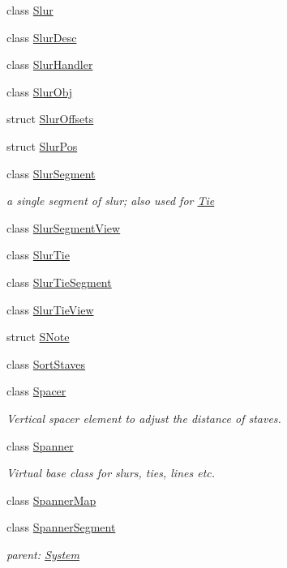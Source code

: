 \begin{DoxyCompactItemize}
class \hyperlink{class_ms_1_1_slur}{Slur}
\item 
class \hyperlink{class_ms_1_1_slur_desc}{Slur\+Desc}
\item 
class \hyperlink{class_ms_1_1_slur_handler}{Slur\+Handler}
\item 
class \hyperlink{class_ms_1_1_slur_obj}{Slur\+Obj}
\item 
struct \hyperlink{struct_ms_1_1_slur_offsets}{Slur\+Offsets}
\item 
struct \hyperlink{struct_ms_1_1_slur_pos}{Slur\+Pos}
\item 
class \hyperlink{class_ms_1_1_slur_segment}{Slur\+Segment}
\begin{DoxyCompactList}\small\item\em a single segment of slur; also used for \hyperlink{class_ms_1_1_tie}{Tie} \end{DoxyCompactList}\item 
class \hyperlink{class_ms_1_1_slur_segment_view}{Slur\+Segment\+View}
\item 
class \hyperlink{class_ms_1_1_slur_tie}{Slur\+Tie}
\item 
class \hyperlink{class_ms_1_1_slur_tie_segment}{Slur\+Tie\+Segment}
\item 
class \hyperlink{class_ms_1_1_slur_tie_view}{Slur\+Tie\+View}
\item 
struct \hyperlink{struct_ms_1_1_s_note}{S\+Note}
\item 
class \hyperlink{class_ms_1_1_sort_staves}{Sort\+Staves}
\item 
class \hyperlink{class_ms_1_1_spacer}{Spacer}
\begin{DoxyCompactList}\small\item\em Vertical spacer element to adjust the distance of staves. \end{DoxyCompactList}\item 
class \hyperlink{class_ms_1_1_spanner}{Spanner}
\begin{DoxyCompactList}\small\item\em Virtual base class for slurs, ties, lines etc. \end{DoxyCompactList}\item 
class \hyperlink{class_ms_1_1_spanner_map}{Spanner\+Map}
\item 
class \hyperlink{class_ms_1_1_spanner_segment}{Spanner\+Segment}
\begin{DoxyCompactList}\small\item\em parent\+: \hyperlink{class_ms_1_1_system}{System} \end{DoxyCompactList}\item 

\end{DoxyCompactItemize}
